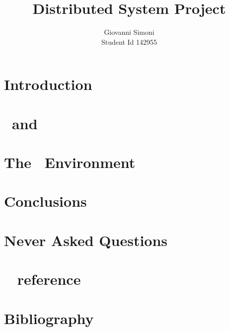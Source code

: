 \documentclass[a4paper]{article}
\title{Distributed System Project}
\author{Giovanni Simoni\\ Student Id 142955}
\begin{document}
    \maketitle
    \newpage

    \tableofcontents
    \newpage

    \section{Introduction}
    

    \section{\Erlang\ and \OTP} \label{sec:erlang-and-otp}
    

    \section{The \YUNA\ Environment} \label{sec:the-yuna-environment}
    

    \section{Conclusions}
    

    \section{Never Asked Questions}
    

    \section{\YUNA\  reference} \label{sec:yuna-api-reference}
    

    \section{Bibliography}
    
\end{document}
